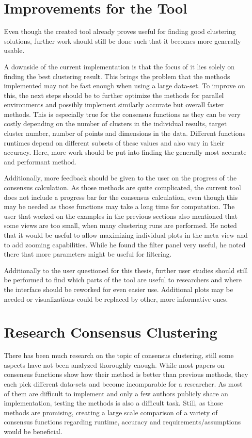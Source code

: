 \documentclass[
	a4paper,
	english,
	twoside,
	openright,               
	11pt                            
	]{report}
\begin{document}
\section{Improvements for the Tool}
Even though the created tool already proves useful for finding good clustering solutions, further work should still be done such that it becomes more generally usable. 

A downside of the current implementation is that the focus of it lies solely on finding the best clustering result. This brings the problem that the methods implemented may not be fast enough when using a large data-set. To improve on this, the next steps should be to further optimize the methods for parallel environments and possibly implement similarly accurate but overall faster methods. This is especially true for the consensus functions as they can be very costly depending on the number of clusters in the individual results, target cluster number, number of points and dimensions in the data. Different functions runtimes depend on different subsets of these values and also vary in their accuracy. Here, more work should be put into finding the generally most accurate and performant method.

Additionally, more feedback should be given to the user on the progress of the consensus calculation. As those methods are quite complicated, the current tool does not include a progress bar for the consensus calculation, even though this may be needed as those functions may take a long time for computation. The user that worked on the examples in the previous sections also mentioned that some views are too small, when many clustering runs are performed. He noted that it would be useful to allow maximizing individual plots in the meta-view and to add zooming capabilities. While he found the filter panel very useful, he noted there that more parameters might be useful for filtering.

Additionally to the user questioned for this thesis, further user studies should still be performed to find which parts of the tool are useful to researchers and where the interface should be reworked for even easier use. Additional plots may be needed or visualizations could be replaced by other, more informative ones.

\section{Research Consensus Clustering}
There has been much research on the topic of consensus clustering, still some aspects have not been analyzed thoroughly enough. While most papers on consensus functions show how their method is better than previous methods, they each pick different data-sets and become incomparable for a researcher. As most of them are difficult to implement and only a few authors publicly share an implementation, testing the methods is also a difficult task. Still, as those methods are promising, creating a large scale comparison of a variety of consensus functions regarding runtime, accuracy and requirements/assumptions would be beneficial.
\end{document}
